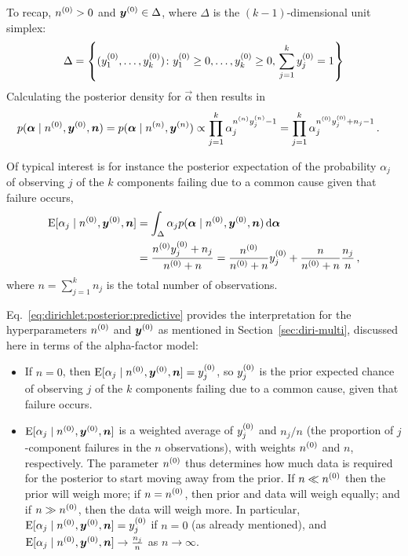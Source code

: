 To recap, $n^{(0)}>0$ and ${\bm y}^{(0)}\in\Delta$, where $\Delta$ is the $(k-1)$-dimensional unit simplex:
\begin{equation*}
\Delta=\left\{
(y^{(0)}_1,\dots,y^{(0)}_k)\colon y^{(0)}_1\ge 0,\dots,y^{(0)}_k\ge 0,\,\sum_{j=1}^k y^{(0)}_j=1
\right\}
\end{equation*}
Calculating the posterior density for $\vec{\alpha}$ then results in
\begin{align*}
p({\bm\alpha}\mid n^{(0)},{\bm y}^{(0)}, {\bm n})
 &= p({\bm\alpha}\mid n^{(n)},{\bm y}^{(n)})
 \propto \prod_{j=1}^k\alpha_j^{n^{(n)}y^{(n)}_j-1} 
 = \prod_{j=1}^k\alpha_j^{n^{(0)}y^{(0)}_j+n_j-1}\,.
\end{align*}

Of typical interest is for instance the posterior expectation of the probability $\alpha_j$
of observing $j$ of the $k$ components failing due to a common cause given that failure occurs,
\begin{align}
\label{eq:dirichlet:posterior:predictive}
\operatorname{E}[\alpha_j\mid n^{(0)},{\bm y}^{(0)},{\bm n}]
 &= \int_{\Delta}\alpha_j p({\bm\alpha}\mid n^{(0)},{\bm y}^{(0)},{\bm n})\,\mathrm{d}{\bm\alpha}\nonumber\\
 &= \frac{n^{(0)}y^{(0)}_j+n_j}{n^{(0)}+n}
  = \frac{n^{(0)}}{n^{(0)}+n} y^{(0)}_j + \frac{n}{n^{(0)}+n} \frac{n_j}{n}\,,
\end{align}
where $n=\sum_{j=1}^k n_j$ is the total number of observations.

Eq.~\eqref{eq:dirichlet:posterior:predictive} provides the interpretation for the hyperparameters
$n^{(0)}$ and ${\bm y}^{(0)}$ as mentioned in Section~\ref{sec:diri-multi},
discussed here in terms of the alpha-factor model:
\begin{itemize}
\item If $n=0$, then $\operatorname{E}[\alpha_j\mid n^{(0)},{\bm y}^{(0)},{\bm n}]=y^{(0)}_j$,
so $y^{(0)}_j$ is the prior expected chance of observing $j$ of the $k$ components failing due to a common cause,
given that failure occurs.
\item $\operatorname{E}[\alpha_j\mid n^{(0)},{\bm y}^{(0)},{\bm n}]$ is a weighted average of $y^{(0)}_j$ and $n_j/n$
(the proportion of $j$-component failures in the $n$ observations), with weights $n^{(0)}$ and $n$, respectively.
The parameter $n^{(0)}$ thus determines how much data is required for the posterior to start moving away from the prior.
If $n \ll n^{(0)}$ then the prior will weigh more;
if $n = n^{(0)}$, then prior and data will weigh equally;
and if $n \gg n^{(0)}$, then the data will weigh more.
In particular, $\operatorname{E}[\alpha_j\mid n^{(0)},{\bm y}^{(0)},{\bm n}]=y^{(0)}_j$ if $n=0$ (as already mentioned),
and $\operatorname{E}[\alpha_j\mid n^{(0)},{\bm y}^{(0)},{\bm n}] \to \frac{n_j}{n}$ as $n \to \infty$.
\end{itemize}


